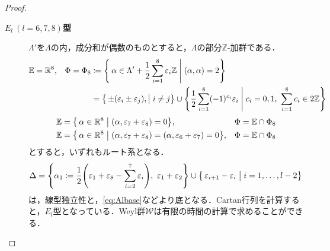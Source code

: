 \documentclass[rep_main]{subfiles}
\begin{document}
\begin{proof}
\begin{description}
		\item[\textbf{$E_l\ (l = 6, 7, 8)$型}] $\Lambda'$を$\Lambda$の内，成分和が偶数のものとすると，$\Lambda$の部分$\mathbb{Z}$-加群である．
		\begin{align}
			\mathbb{E} &= \mathbb{R}^8,&\Phi = \Phi_8 &\coloneqq \Biggl\{\, \alpha \in \Lambda' + \frac{1}{2}\sum_{i=1}^8\varepsilon_i\mathbb{Z} \Biggm| (\alpha, \alpha) = 2\Biggr\} \\
			&&&= \bigl\{\, \pm(\varepsilon_i \pm \varepsilon_j), \bigm| i \neq j \bigr\} \cup \Biggl\{ \frac{1}{2}\sum_{i=1}^8 (-1)^{c_i}\varepsilon_i \Biggm| c_i = 0, 1,\ \sum_{i=1}^8 c_i \in 2\mathbb{Z} \Biggr\}
		\end{align}
		\begin{align}
			\mathbb{E} &= \bigl\{\, \alpha \in \mathbb{R}^8 \bigm| (\alpha, \varepsilon_7 + \varepsilon_8) = 0\bigr\} ,&  \Phi &= \mathbb{E} \cap \Phi_8 \\
			\mathbb{E} &= \bigl\{\, \alpha \in \mathbb{R}^8 \bigm| (\alpha, \varepsilon_7 + \varepsilon_8) = (\alpha, \varepsilon_6 + \varepsilon_7) = 0\bigr\} ,&  \Phi &= \mathbb{E} \cap \Phi_8
		\end{align}
		とすると，いずれもルート系となる．
		\begin{equation}
			\Delta = \Biggl\{\alpha_1 \coloneqq \frac{1}{2}\Biggl(\varepsilon_1 + \varepsilon_8 - \sum_{i = 2}^7 \varepsilon_i \Biggr),\ \varepsilon_1 + \varepsilon_2 \Biggr\} \cup \bigl\{\, \varepsilon_{i+1} - \varepsilon_i \bigm| i = 1, \ldots, l-2\bigr\}
		\end{equation}	
		は，線型独立性と，\eqref{eq:Albase}などより底となる．Cartan行列を計算すると，$E_l$型となっている．Weyl群$\mathscr{W}$は有限の時間の計算で求めることができる．
		

\end{description}
\end{proof}
\end{document}
